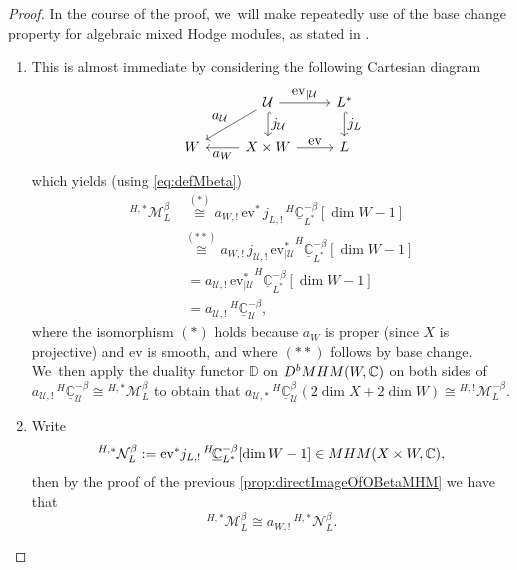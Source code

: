 \documentclass[11pt]{article}
\let\mathds\mathbb
\let\ts\textstyle
\newcommand{\ev}{\mathrm{ev}}
\newcommand{\dC}{{\mathds C}}\let\C\dC
\newcommand{\bD}{{\mathbb D}}\let\mbd\bD
\newcommand{\cM}{\mathcal{M}}
\newcommand{\cN}{\mathcal{N}}
\newcommand{\cU}{\mathcal{U}}\let\mcu\cU
\newcommand{\MHM}{\textup{MHM}}
\newcommand{\Mh}{{^{H,*}}\cM_L^\beta}
\newcommand{\MhD}{{^{H,!}}\cM_L^{-\beta}}
\newcommand{\Nh}{{^{H,*}}\cN_L^\beta}
\begin{document}
\begin{proof}

In the course of the proof, we~will make repeatedly use of the base change property for algebraic mixed Hodge modules, as stated in \cite[\S 4.4.3]{SaitoMHM}.
\begin{enumerate}
\item
This is almost immediate by considering the following Cartesian diagram
\[
\begin{tikzcd}
& \cU \ar{r}{\ts \ev_{|\cU}} \ar[hook]{d}{\ts j_{\cU}} \ar[swap]{ld}{\ts a_\cU} & L^* \ar[hook]{d}{\ts j_{L}}\\
W & X\times W \ar{r}{\ts \ev} \ar{l}{\ts a_W} & L
\end{tikzcd}
\]
which yields (using \eqref{eq:defMbeta})
\begin{align*}
\Mh
&\,\stackrel{(*)}{\cong}
a_{W,!}\, \ev^*\,{j_{L,!}}\, ^{H\!}\underline{\dC}^{-\beta}_{L^{*}}[\dim W-1]\\
&\stackrel{(**)}{\cong}
a_{W,!}\, j_{\cU,!}\, {\ev_{|\cU}^*} ^{H\!}\underline{\dC}^{-\beta}_{L^{*}}[\dim W -1] \\
&\;=
a_{\cU,!}\, {\ev_{|\cU}^*} ^{H\!}\underline{\dC}^{-\beta}_{L^{*}}[\dim W -1]\\
&\;=
{a_{\cU,!}}\, ^{H\!}\underline{\dC}^{-\beta}_{\cU},
\end{align*}
where the isomorphism $(*)$ holds because $a_W$ is proper (since $X$ is projective)
and $\ev$ is smooth, and where $(**)$ follows by base change. We~then apply the duality functor $\bD$ on $D^b\MHM(W,\dC)$ on both sides of
$a_{\cU,!} \, ^{H\!}\underline{\dC}^{-\beta}_{\cU}\cong \Mh$ to obtain that $a_{\cU,*} \, ^{H\!}\underline{\dC}^{\beta}_{\cU}(2\dim X + 2\dim W)
\cong \MhD$.
\item
Write
\[
\Nh:=\ev^* j_{L,!}\, ^{H\!}\underline{\dC}^{-\beta}_{L^{*}}[\dim W-1] \in \MHM(X\times W,\dC),
\]
then by the proof of the previous
\cref{prop:directImageOfOBetaMHM} we have that
\[
\Mh \cong a_{W,!}\, \Nh.
\]


\end{enumerate}
\end{proof}
\end{document}
